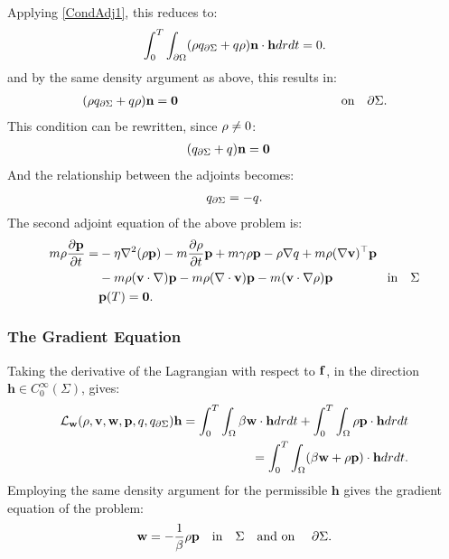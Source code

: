 Applying \ref{CondAdj1}, this reduces to:
\begin{align*}
\int_0^T \int_{\partial\Omega} (\rho  q_{\partial \Sigma} + q \rho)  \mathbf{n}\cdot \mathbf{h} dr dt=0.
\end{align*}
and by the same density argument as above, this results in:
\begin{align*}
(\rho  q_{\partial \Sigma} + q \rho)  \mathbf{n} =\mathbf{0} \qquad \qquad\qquad\qquad\qquad\qquad \quad \text{on} \quad \partial \Sigma.
\end{align*}
This condition can be rewritten, since $\rho \neq 0$:
\begin{align*}
&( q_{\partial \Sigma} + q ) \mathbf{n} =\mathbf{0}
\end{align*}
And the relationship between the adjoints becomes:
\begin{align*}
q_{\partial \Sigma} = -q.
\end{align*}
The second adjoint equation of the above problem is:
\begin{align}
\label{INAdj2}
  m\rho \frac{\partial \mathbf{p}}{\partial t} =& - \eta \nabla^2 (\rho \mathbf{p}) - m \frac{\partial \rho}{\partial t} \mathbf{p}   +m \gamma \rho \mathbf{p}-\rho\nabla q +m \rho (\nabla \mathbf{v})^\top\mathbf{p} \\
&-m \rho (\mathbf{v} \cdot \nabla)\mathbf{p} - m \rho (\nabla \cdot \mathbf{v})\mathbf{p}  - m (\mathbf{v} \cdot \nabla \rho)\mathbf{p}  \ \qquad\qquad \text{in} \quad \Sigma\notag\\
&\mathbf{p}(T)=\mathbf{0}. \notag
\end{align}

\subsubsection{The Gradient Equation}
Taking the derivative of the Lagrangian with respect to $\mathbf{f}$, in the direction $\mathbf{h} \in C_0^\infty(\Sigma)$, gives:
\begin{align*}
\mathcal{L}_{\mathbf{w}}(\rho,\mathbf{v},\mathbf{w},\mathbf{p},q,q_{\partial \Sigma}) \mathbf{h}= \int_0^T \int_\Omega \beta \mathbf{w} \cdot \mathbf{h} dr dt + \int_0^T \int_\Omega \rho \mathbf{p} \cdot \mathbf{h} dr dt \\
= \int_0^T \int_\Omega ( \beta \mathbf{w} + \rho \mathbf{p}) \cdot \mathbf{h} dr dt.
\end{align*}
Employing the same density argument for the permissible $\mathbf{h}$ gives the gradient equation of the problem:
\begin{align*}
 \mathbf{w} = - \frac{1}{\beta} \rho \mathbf{p} \quad \text{in} \quad \Sigma \quad \text{and on } \quad \partial\Sigma.
\end{align*}

